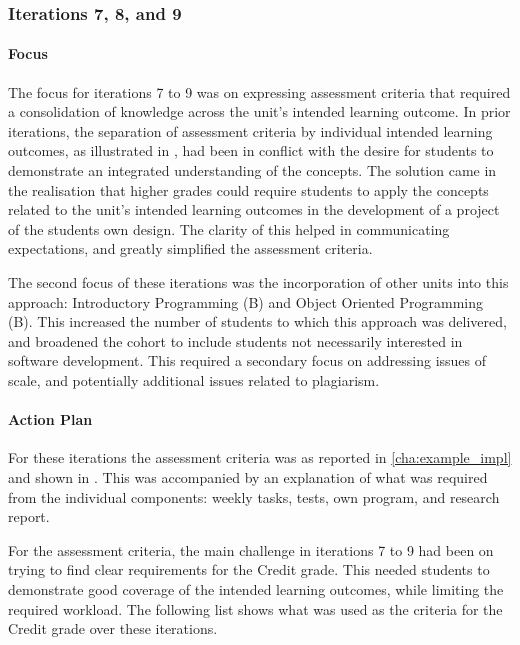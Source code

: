 \subsubsection{Iterations 7, 8, and 9} %
\label{sub:iterations_7_to_9}

\paragraph{Focus} %

The focus for iterations 7 to 9 was on expressing assessment criteria that required a consolidation of knowledge across the unit's intended learning outcome. In prior iterations, the separation of assessment criteria by individual intended learning outcomes, as illustrated in , had been in conflict with the desire for students to demonstrate an integrated understanding of the concepts. The solution came in the realisation that higher grades could require students to apply the concepts related to the unit's intended learning outcomes in the development of a project of the students own design. The clarity of this helped in communicating expectations, and greatly simplified the assessment criteria. 

The second focus of these iterations was the incorporation of other units into this approach: Introductory Programming (B) and Object Oriented Programming (B). This increased the number of students to which this approach was delivered, and broadened the cohort to include students not necessarily interested in software development. This required a secondary focus on addressing issues of scale, and potentially additional issues related to plagiarism.

\paragraph{Action Plan} %

For these iterations the assessment criteria was as reported in \cref{cha:example_impl} and shown in . This was accompanied by an explanation of what was required from the individual components: weekly tasks, tests, own program, and research report. 

For the assessment criteria, the main challenge in iterations 7 to 9 had been on trying to find clear requirements for the Credit grade. This needed students to demonstrate good coverage of the intended learning outcomes, while limiting the required workload. The following list shows what was used as the criteria for the Credit grade over these iterations.

